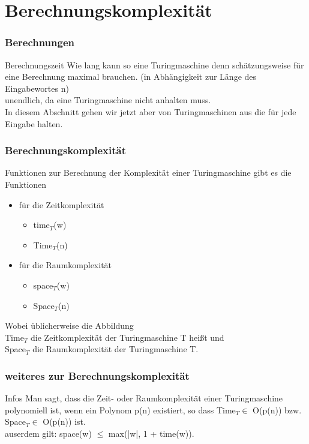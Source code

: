 \documentclass{beamer}
\begin{document}
\section{Berechnungskomplexität}
\begin{frame}
	\frametitle{Berechnungen}
	\begin{block}{Berechnungszeit}
		Wie lang kann so eine Turingmaschine denn schätzungsweise für eine Berechnung maximal brauchen. (in Abhängigkeit zur Länge des Eingabewortes n)\\
		\bigskip
		\pause
		unendlich, da eine Turingmaschine nicht anhalten muss.\\
		
		In diesem Abschnitt gehen wir jetzt aber von Turingmaschinen aus die für jede Eingabe halten.
	\end{block}
\end{frame}

\begin{frame}
	\frametitle{Berechnungskomplexität}
	\begin{block}{Funktionen}
		zur Berechnung der Komplexität einer Turingmaschine gibt es die Funktionen 	
		\begin{itemize}
			\item für die Zeitkomplexität\\
			\begin{itemize}
				\item time$_T$(w)
				\item Time$_T$(n)
			\end{itemize}
			\item für die Raumkomplexität\\
			\begin{itemize}
				\item space$_T$(w)
				\item Space$_T$(n)			
			\end{itemize}
		\end{itemize}	
		
		Wobei üblicherweise die Abbildung\\
		Time$_T$ die Zeitkomplexität der Turingmaschine T heißt und\\
		Space$_T$ die Raumkomplexität der Turingmaschine T.
	\end{block}
\end{frame}

\begin{frame}
	\frametitle{weiteres zur Berechnungskomplexität}
	\begin{block}{Infos}
		Man sagt, dass die Zeit- oder Raumkomplexität einer Turingmaschine polynomiell ist, wenn ein Polynom p(n) existiert, so dass Time$_T \in$ O(p(n)) bzw. Space$_T \in$ O(p(n)) ist.\\
		auserdem gilt: space(w) $\leq$ max(|w|, 1 + time(w)).
	\end{block}
\end{frame}
\end{document}
